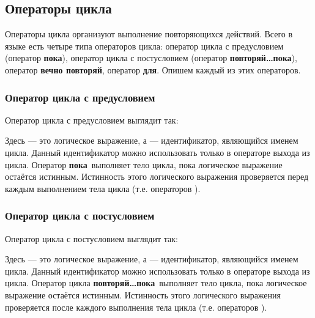 \documentclass[10pt]{report}
\begin{document}
    \subsection{Операторы цикла}
Операторы цикла организуют выполнение повторяющихся действий. Всего в языке есть четыре типа операторов цикла: оператор цикла с предусловием (оператор \textbf{\glqq пока\grqq}),
оператор цикла с постусловием (оператор \textbf{\glqq повторяй\dots пока\grqq}), оператор \textbf{\glqq вечно повторяй\grqq}, оператор \textbf{\glqq для\grqq}. Опишем каждый из этих операторов.
        \subsubsection{Оператор цикла с предусловием}
Оператор цикла с предусловием выглядит так:
\begin{center}
\textcolor{Green}{}
\end{center}
Здесь \textcolor{Green}{} --- это логическое выражение, а  \textcolor{Green}{} --- идентификатор, являющийся именем цикла.
Данный идентификатор можно использовать только в операторе выхода из цикла. Оператор \textbf{\glqq пока\grqq}\ выполняет тело цикла, пока логическое выражение
\textcolor{Green}{} остаётся истинным. Истинность этого логического выражения проверяется перед каждым выполнением тела цикла (т.е.
операторов \textcolor{Green}{}).
        \subsubsection{Оператор цикла с постусловием}
Оператор цикла с постусловием выглядит так:
\begin{center}
\textcolor{Green}{}
\end{center}
Здесь \textcolor{Green}{} --- это логическое выражение, а  \textcolor{Green}{} --- идентификатор, являющийся именем цикла.
Данный идентификатор можно использовать только в операторе выхода из цикла. Оператор цикла \textbf{\glqq повторяй\dots пока\grqq}\ выполняет тело цикла, пока логическое
выражение \textcolor{Green}{} остаётся истинным. Истинность этого логического выражения проверяется после каждого выполнения тела цикла (т.е.
операторов \textcolor{Green}{}).
\end{document}

